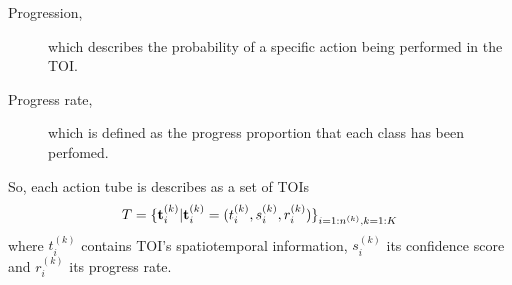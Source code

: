 \documentclass{report}
\begin{document}
\begin{description}
\item[ Progression,  ] which describes the probability of a specific action being performed in the TOI. 

\item [ Progress rate, ] which is defined as the progress proportion that each class has been perfomed.
  
\end{description}

So, each action tube is describes as a set of TOIs
\[  T = {\{ {\bf t}_i^{(k)} | {\bf t}_i^{(k)} = ( t_i^{(k)}, s_i^{(k)}, r_i^{(k)} ) \}}_{i=1:n^{(k)},k=1:K} \]
where $ t_i^{(k)} $ contains TOI's spatiotemporal information, $ s_i^{(k)} $ its confidence score and $ r_i^{(k)} $ its progress rate.
\end{document}
